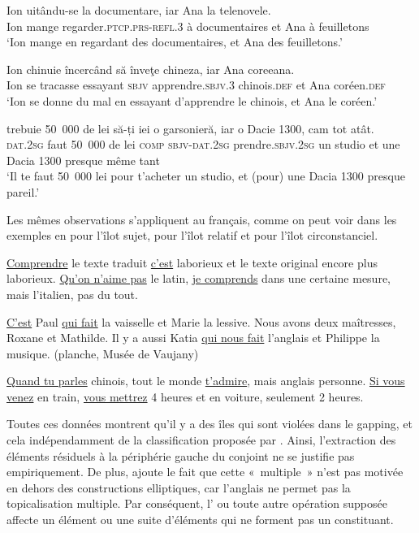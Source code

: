 \ex 
\gll Ion    uitându-se  la  documentare,  iar  Ana  la  telenovele.\\
Ion  mange  regarder.\textsc{ptcp.prs-refl.3}  à  documentaires  et  Ana  à  feuilletons\\
\glt ‘Ion mange en regardant des documentaires, et Ana des feuilletons.’

\ex 
\gll Ion    chinuie  încercând  să  înveţe  chineza,  iar  Ana  coreeana.\\
Ion  se  tracasse  essayant  \textsc{sbjv}  apprendre.\textsc{sbjv.3} chinois.\textsc{def}  et  Ana  coréen.\textsc{def}\\
\glt ‘Ion se donne du mal en essayant d’apprendre le chinois, et Ana le coréen.’

\ex 
\gll {}  trebuie  50~000  de  lei    să-ți  iei  o garsonieră,  iar  o  Dacie  1300,  cam  tot  atât.\\
\textsc{dat.2sg} faut  50~000  de  lei \textsc{comp} \textsc{sbjv-dat.2sg} prendre.\textsc{sbjv.2sg}  un studio  et  une  Dacia  1300  presque  même  tant\\
\glt ‘Il te faut 50~000 lei pour t’acheter un studio, et (pour) une Dacia 1300 presque pareil.’
\z
\z


Les mêmes observations s’appliquent au français, comme on peut voir dans les exemples en  pour l’îlot sujet,  pour l’îlot relatif et  pour l’îlot circonstanciel.

\ea \label{ch2:ex221}
\ea \uline{Comprendre} le texte traduit \uline{c’est} laborieux et le texte original encore plus laborieux.
\ex \uline{Qu’on n’aime pas} le latin, \uline{je comprends} dans une certaine mesure, mais l’italien, pas du tout.
\z
\z

\ea \label{ch2:ex222}
\ea \uline{C’est} Paul \uline{qui fait} la vaisselle et Marie la lessive.
\ex Nous avons deux maîtresses, Roxane et Mathilde. Il y a aussi Katia \uline{qui nous fait} l’anglais et Philippe la musique. (planche, Musée de Vaujany)
\z
\z

\ea \label{ch2:ex223}
\ea \uline{Quand tu parles} chinois, tout le monde \uline{t’admire}, mais anglais personne.
\ex \uline{Si vous venez} en train, \uline{vous mettrez} 4 heures et en voiture, seulement 2 heures.
\z
\z

Toutes ces données montrent qu’il y a des îles qui sont violées dans le gapping, et cela indépendamment de la classification proposée par \citet{Merchant2001}. Ainsi, l’extraction des éléments résiduels à la périphérie gauche du conjoint ne se justifie pas empiriquement. De plus, \citet[463]{Culicover2009} ajoute le fait que cette  «~multiple~» n’est pas motivée en dehors des constructions elliptiques, car l’anglais ne permet pas la topicalisation multiple. Par conséquent, l’ ou toute autre opération supposée affecte un élément ou une suite d’éléments qui ne forment pas un constituant.

